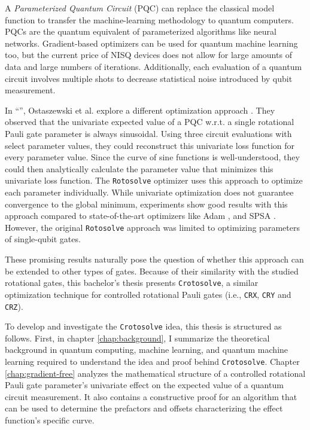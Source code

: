 A \emph{Parameterized Quantum Circuit} (PQC) can replace the classical model
function to transfer the machine-learning methodology to quantum computers.
PQCs are the quantum equivalent of parameterized algorithms like neural
networks.
Gradient-based optimizers can be used for quantum machine learning too, but
the current price of NISQ devices does not allow for large amounts of data and
large numbers of iterations.
Additionally, each evaluation of a quantum circuit involves multiple shots to
decrease statistical noise introduced by qubit measurement.

In ``\emph{}'', Ostaszewski et al.
explore a different optimization approach \cite{ostaszewski_structure_2021}.
They observed that the univariate expected value of a PQC w.r.t. a single
rotational Pauli gate parameter is always sinusoidal.
Using three circuit evaluations with select parameter values, they could
reconstruct this univariate loss function for every parameter value.
Since the curve of sine functions is well-understood, they could then
analytically calculate the parameter value that minimizes this univariate loss
function.
The \texttt{Rotosolve} optimizer uses this approach to optimize each parameter
individually.
While univariate optimization does not guarantee convergence to the global
minimum, experiments show good results with this approach compared to
state-of-the-art optimizers like Adam \cite{kingma_adam_2017}, and SPSA
\cite{spall_multivariate_1992}.
However, the original \texttt{Rotosolve} approach was limited to optimizing
parameters of single-qubit gates.

These promising results naturally pose the question of whether this approach can
be extended to other types of gates.
Because of their similarity with the studied rotational gates, this bachelor's
thesis presents \texttt{Crotosolve}, a similar optimization technique for
controlled rotational Pauli gates (i.e., \texttt{CRX}, \texttt{CRY} and
\texttt{CRZ}).

To develop and investigate the \texttt{Crotosolve} idea, this thesis is
structured as follows.
First, in chapter \ref{chap:background}, I summarize the theoretical background
in quantum computing, machine learning, and quantum machine learning required to
understand the idea and proof behind \texttt{Crotosolve}.
Chapter \ref{chap:gradient-free} analyzes the mathematical structure of a
controlled rotational Pauli gate parameter's univariate effect on the
expected value of a quantum circuit measurement.
It also contains a constructive proof for an algorithm that can be used to
determine the prefactors and offsets characterizing the effect function's
specific curve.


